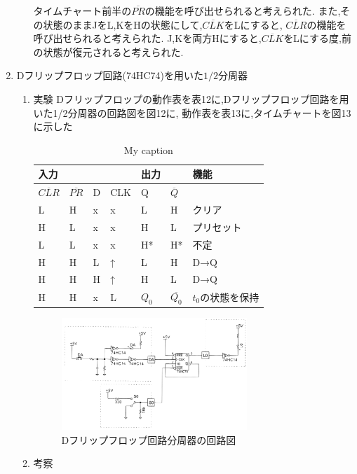 \documentclass[twocolumn, 10pt,a4j]{jsarticle}
\begin{document}
\begin{enumerate}
\begin{enumerate}
            タイムチャート前半の$\overline{PR}$の機能を呼び出せられると考えられた.
            また,その状態のままJをL,KをHの状態にして,$\overline{CLK}$をLにすると,
            $\overline{CLR}$の機能を呼び出せられると考えられた.
            J,Kを両方Hにすると,$\overline{CLK}$をLにする度,前の状態が復元されると考えられた.
        \end{enumerate}
      \item Dフリップフロップ回路(74HC74)を用いた$1/2$分周器
        \begin{enumerate}
          \item 実験
          Dフリップフロップの動作表を表12に,Dフリップフロップ回路を用いた1/2分周器の回路図を図12に,
          動作表を表13に,タイムチャートを図13に示した
          \begin{table}[H]
            \centering
            \caption{My caption}
            \label{my-label}
            \footnotesize
            \begin{tabular}{llll|ll|l}
            入力  &    &   &     & 出力 &    & 機能         \\ \hline
            $\overline{CLR}$ & $\overline{PR}$ & D & CLK & Q  & $\overline{Q}$ &            \\ \hline
            L   & H  & x & x   & L  & H  & クリア   \\
            H   & L  & x & x   & H  & L  & プリセット \\
            L   & L  & x & x   & H* & H* & 不定         \\
            H   & H  & L & ↑   & L  & H  & D→Q        \\
            H   & H  & H & ↑   & H  & L  & D→Q        \\
            H   & H  & x & L   & $Q_{0}$ & $\overline{Q_{0}}$ & $t_{0}$の状態を保持  
            \end{tabular}
          \end{table}
          \begin{figure}[H]
              \begin{center}
                \includegraphics[width=7cm]{../img/junjokairo/d_ff.png}
                \caption{Dフリップフロップ回路分周器の回路図}
              \end{center}
          \end{figure}
          \item 考察
        \end{enumerate}
    \end{enumerate}
\end{document}
